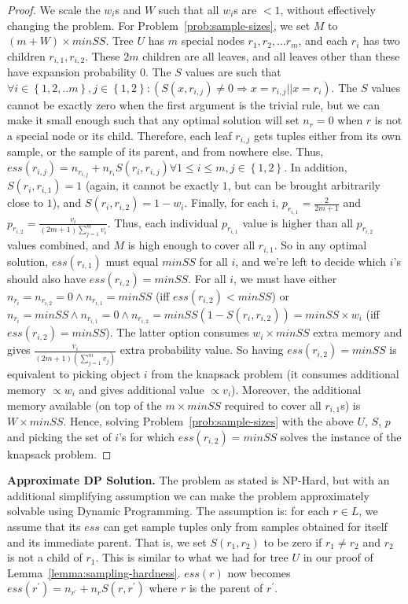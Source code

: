 \documentclass[10pt,journal,compsoc]{IEEEtran}
\newcounter{prob}
\newcommand{\stitle}[1]{\vspace{0.5em}\noindent\textbf{#1}}
\begin{document}
{\begin{proof}
We scale the $w_i$s and $W$ such that all $w_i$s are $< 1$, without effectively changing the problem. For Problem~\ref{prob:sample-sizes}, we set $M$ to $(m + W) \times minSS$. Tree $U$ has $m$ special nodes $r_1, r_2, ... r_m$, and each $r_i$ has two children $r_{i,1}, r_{i,2}$. These $2m$ children are all leaves, and all leaves other than these have expansion probability $0$. 
The $S$ values are such that $\forall i \in \left\lbrace 1, 2, ..m\right\rbrace, j \in \left\lbrace 1, 2 \right\rbrace : (S(x, r_{i,j}) \neq 0 \Rightarrow x = r_{i,j} || x = r_i)$. The $S$ values cannot be exactly zero when the first argument is the trivial rule, but we can make it small enough such that any optimal solution will set $n_r = 0$ when $r$ is not a special node or its child. Therefore, each leaf $r_{i,j}$ gets tuples either from its own sample, or the sample of its parent, and from nowhere else. Thus, $ess(r_{i,j}) = n_{r_{i,j}} + n_{r_i}S(r_i, r_{i,j}) \forall 1 \leq i \leq m, j \in \left\lbrace 1,2 \right\rbrace$. In addition, $S(r_i, r_{i,1}) = 1$ (again, it cannot be exactly $1$, but can be brought arbitrarily close to $1$), and $S(r_i, r_{i,2}) = 1 - w_i$. Finally, for each i, $p_{r_{i,1}} = \frac{2}{2m+1}$ and $p_{r_{i,2}} = \frac{v_i}{(2m+1)\sum_{j=1}^{m}v_i}$. Thus, each individual $p_{r_{i,1}}$ value is higher than all $p_{r_{i,2}}$ values combined, and $M$ is high enough to cover all $r_{i,1}$. So in any optimal solution, $ess(r_{i,1})$ must equal $minSS$ for all $i$, and we're left to decide which $i$'s should also have $ess(r_{i,2}) = minSS$. For all $i$, we must have either $n_{r_i} = n_{r_{i,2}} = 0 \land n_{r_{i,1}} = minSS$ (iff $ess(r_{i,2}) < minSS$) or $n_{r_i} = minSS \land n_{r_{i,1}} = 0 \land n_{r_{i,2}} = minSS (1 - S(r_i, r_{i,2})) = minSS \times w_i$ (iff $ess(r_{i,2}) = minSS$). The latter option consumes $w_i \times minSS$ extra memory and gives $\frac{v_i}{(2m+1)(\sum_{j=1}^{m}v_j)}$ extra probability value. So having $ess(r_{i,2}) = minSS$ is equivalent to picking object $i$ from the knapsack problem (it consumes additional memory $\propto w_i$ and gives additional value $\propto v_i$). Moreover, the additional memory available (on top of the $m \times minSS$ required to cover all $r_{i,1}$s) is $W\times minSS$. Hence, solving Problem~\ref{prob:sample-sizes} with the above $U$, $S$, $p$ and picking the set of $i$'s for which $ess(r_{i,2}) = minSS$ solves the instance of the knapsack problem. 
\end{proof}
}

\stitle{Approximate DP Solution.} The problem as stated is {\sc NP-Hard}, but with an additional simplifying assumption we can make the problem approximately solvable using  Dynamic Programming. The assumption is: for each $r \in L$, we assume that its $ess$ can get sample tuples only from samples obtained for itself and its immediate parent. That is, we set $S(r_1, r_2)$ to be zero if $r_1 \neq r_2$ and $r_2$ is not a child of $r_1$. This is similar to what we had for tree $U$ in our proof of Lemma~\ref{lemma:sampling-hardness}. $ess(r)$ now becomes $ess(r^{\prime}) = n_{r^{\prime}} + n_rS(r, r^{\prime})$ where $r$ is the parent of $r^{\prime}$.
\end{document}
